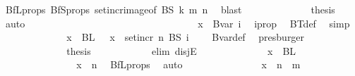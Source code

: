 \begin{isabellebody}
\ BfL{\isacharunderscore}{\kern0pt}props\ BfS{\isacharunderscore}{\kern0pt}props{\isacharparenleft}{\kern0pt}{}{\isacharparenright}{\kern0pt}\ set{\isacharunderscore}{\kern0pt}incr{\isacharunderscore}{\kern0pt}image{\isacharbrackleft}{\kern0pt}of\ BS\ k\ m\ n{\isacharbrackright}{\kern0pt}\ \isamarkupfalse%
\ blast\isanewline
\ \ \ \ \ \ \ \ \ \ \isamarkupfalse%
\ \isamarkupfalse%
\ {\isacharquery}{\kern0pt}thesis\ \isamarkupfalse%
\ auto\isanewline
\ \ \ \ \ \ \ \ \isamarkupfalse%
\isanewline
\ \ \ \ \ \ \ \ \ \ \isamarkupfalse%
\ {}\isanewline
\ \ \ \ \ \ \ \ \ \ \isamarkupfalse%
\ \isamarkupfalse%
\ {\isachardoublequoteopen}x\ {\isasymin}\ Bvar\ i{\isachardoublequoteclose}\ \isamarkupfalse%
\ i{\isacharunderscore}{\kern0pt}prop\ \isamarkupfalse%
\ BT{\isacharunderscore}{\kern0pt}def\ \isamarkupfalse%
\ simp\isanewline
\ \ \ \ \ \ \ \ \ \ \isamarkupfalse%
\ \isamarkupfalse%
\ {\isachardoublequoteopen}x\ {\isasymin}\ BL\ {}\ {\isasymor}\ x\ {\isasymin}\ set{\isacharunderscore}{\kern0pt}incr\ n\ {\isacharparenleft}{\kern0pt}BS\ {\isacharparenleft}{\kern0pt}i\ {\isacharminus}{\kern0pt}\ {}{\isacharparenright}{\kern0pt}{\isacharparenright}{\kern0pt}{\isachardoublequoteclose}\ \isamarkupfalse%
\ Bvar{\isacharunderscore}{\kern0pt}def\ \isamarkupfalse%
\ presburger\isanewline
\ \ \ \ \ \ \ \ \ \ \isamarkupfalse%
\ \isamarkupfalse%
\ {\isacharquery}{\kern0pt}thesis\isanewline
\ \ \ \ \ \ \ \ \ \ \isamarkupfalse%
\ {\isacharparenleft}{\kern0pt}elim\ disjE{\isacharparenright}{\kern0pt}\isanewline
\ \ \ \ \ \ \ \ \ \ \ \ \isamarkupfalse%
\ {\isachardoublequoteopen}x\ {\isasymin}\ BL\ {}{\isachardoublequoteclose}\isanewline
\ \ \ \ \ \ \ \ \ \ \ \ \isamarkupfalse%
\ \isamarkupfalse%
\ {\isachardoublequoteopen}x\ {\isasymin}\ {\isacharbraceleft}{\kern0pt}{\isachardot}{\kern0pt}{\isachardot}{\kern0pt}{\isacharless}{\kern0pt}n{\isacharbraceright}{\kern0pt}{\isachardoublequoteclose}\ \isamarkupfalse%
\ BfL{\isacharunderscore}{\kern0pt}props\ \isamarkupfalse%
\ auto\isanewline
\ \ \ \ \ \ \ \ \ \ \ \ \isamarkupfalse%
\ \isamarkupfalse%
\ {\isachardoublequoteopen}x\ {\isasymin}\ {\isacharbraceleft}{\kern0pt}{\isachardot}{\kern0pt}{\isachardot}{\kern0pt}{\isacharless}{\kern0pt}n\ {\isacharplus}{\kern0pt}\ m{\isacharbraceright}{\kern0pt}{\isachardoublequoteclose}\ \isamarkupfalse%

\end{isabellebody}
